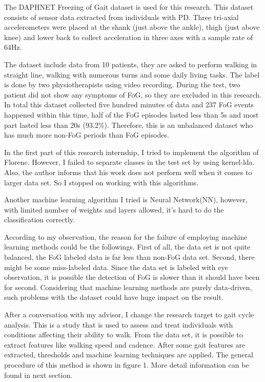 \documentclass[article]{article}
\begin{document}
 	The DAPHNET Freezing of Gait dataset is used for this research. This dataset consists of sensor data extracted from individuals with PD. Three tri-axial accelerometers were placed at the shank (just above the ankle), thigh (just above knee) and lower back to collect acceleration in three axes with a sample rate of 64Hz.

	The dataset include data from 10 patients, they are asked to perform walking in straight line, walking with numerous turns and some daily living tasks. The label is done by two physiotherapists using video recording. During the test, two patient did not show any symptoms of FoG, so they are excluded in this research. In total this dataset collected five hundred minutes of data and 237 FoG events happened within this time, half of the FoG episodes lasted less than 5s and most part lasted less than 20s (93.2\%). Therefore, this is an unbalanced dataset who has much more non-FoG periods than FoG episodes. 


    In the first part of this research internship, I tried to implement the algorithm of Florenc. However, I failed to separate classes in the test set by using kernel-lda. Also, the author informs that his work does not perform well when it comes to larger data set. So I stopped on working with this algorithms.
    
    Another machine learning algorithm I tried is Neural Network(NN), however, with limited number of weights and layers allowed, it's hard to do the classification correctly.
    
    According to my observation, the reason for the failure of employing  machine learning methods could be the followings. First of all, the data set is not quite balanced, the FoG labeled data is far less than non-FoG data set. Second, there might be some miss-labeled data. Since the data set is labeled with eye observation, it is possible the detection of FoG is slower than it should have been for second. Considering that machine learning methods are purely data-driven, such problems with the dataset could have huge impact on the result.
    
    After a conversation with my advisor, I change the research target to gait cycle analysis. This is a study that is used to assess and treat individuals with conditions affecting their ability to walk. From the data set, it is possible to extract features like walking speed and cadence. After some gait features are extracted, thresholds and machine learning techniques are applied. The general procedure of this method is shown in figure 1. More detail information can be found in next section.
    
\end{document}
